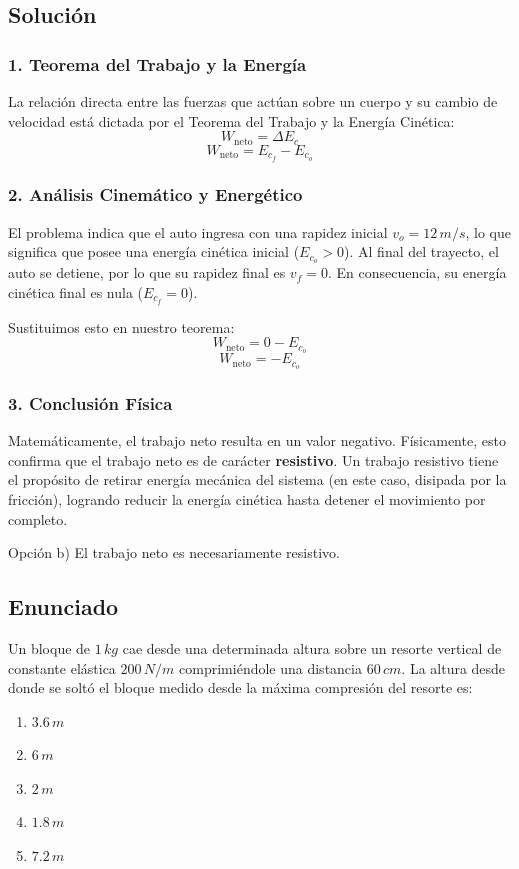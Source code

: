 \documentclass[12pt, a4paper]{article}
\begin{document}
\subsection*{Solución}

\subsubsection*{1. Teorema del Trabajo y la Energía}
La relación directa entre las fuerzas que actúan sobre un cuerpo y su cambio de velocidad está dictada por el Teorema del Trabajo y la Energía Cinética:
$$ W_{\text{neto}} = \Delta E_c $$
$$ W_{\text{neto}} = E_{c_f} - E_{c_o} $$

\subsubsection*{2. Análisis Cinemático y Energético}
El problema indica que el auto ingresa con una rapidez inicial $v_o = 12 \, \si{m/s}$, lo que significa que posee una energía cinética inicial ($E_{c_o} > 0$).
Al final del trayecto, el auto se detiene, por lo que su rapidez final es $v_f = 0$. En consecuencia, su energía cinética final es nula ($E_{c_f} = 0$).

Sustituimos esto en nuestro teorema:
$$ W_{\text{neto}} = 0 - E_{c_o} $$
$$ W_{\text{neto}} = -E_{c_o} $$

\subsubsection*{3. Conclusión Física}
Matemáticamente, el trabajo neto resulta en un valor negativo. Físicamente, esto confirma que el trabajo neto es de carácter \textbf{resistivo}. Un trabajo resistivo tiene el propósito de retirar energía mecánica del sistema (en este caso, disipada por la fricción), logrando reducir la energía cinética hasta detener el movimiento por completo.

\begin{tcolorbox}[colback=green!5!white, colframe=green!50!black, title=Respuesta Final]
\centering Opción b) El trabajo neto es necesariamente resistivo.
\end{tcolorbox}

\newpage

\subsection*{Enunciado}
Un bloque de $1 \, \si{kg}$ cae desde una determinada altura sobre un resorte vertical de constante elástica $200 \, \si{N/m}$ comprimiéndole una distancia $60 \, \si{cm}$. La altura desde donde se soltó el bloque medido desde la máxima compresión del resorte es:
\begin{enumerate}[label=\alph*)]
    \item $3.6 \, \si{m}$
    \item $6 \, \si{m}$
    \item $2 \, \si{m}$
    \item $1.8 \, \si{m}$
    \item $7.2 \, \si{m}$
\end{enumerate}
\end{document}

